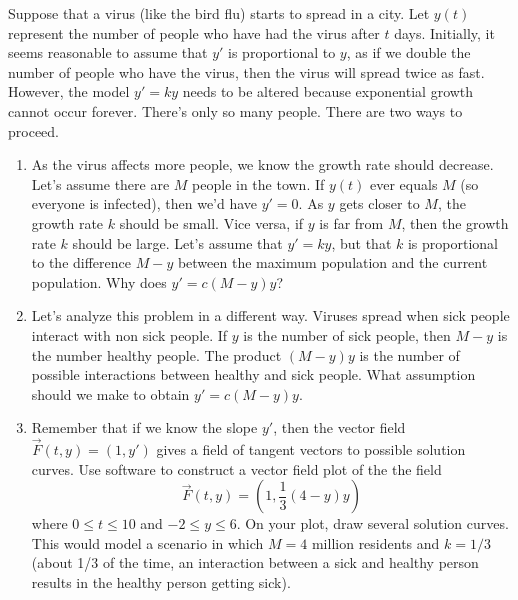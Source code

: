 \begin{problem}
 Suppose that a virus (like the bird flu) starts to spread in a city. Let $y(t)$ represent the number of people who have had the virus after $t$ days.  Initially, it seems reasonable to assume that $y'$ is proportional to $y$, as if we double the number of people who have the virus, then the virus will spread twice as fast. However, the model $y'=ky$ needs to be altered because exponential growth cannot occur forever.  There's only so many people. There are two ways to proceed.
\begin{enumerate}
\item 
{}%
As the virus affects more people, we know the growth rate should decrease. Let's assume there are $M$ people in the town. If $y(t)$ ever equals $M$ (so everyone is infected), then we'd have $y'=0$. As $y$ gets closer to $M$, the growth rate $k$ should be small. Vice versa, if $y$ is far from $M$, then the growth rate $k$ should be large. Let's assume that $y'=ky$, but that $k$ is proportional to the difference $M-y$ between the maximum population and the current population. Why does $y'=c(M-y)y$?
\item Let's analyze this problem in a different way. 
Viruses spread when sick people interact with non sick people.  If $y$ is the number of sick people, then $M-y$ is the number healthy people. The product $(M-y)y$ is the number of possible interactions between healthy and sick people. What assumption should we make to obtain $y'=c(M-y)y$.
\item
{}%
Remember that if we know the slope $y'$, then the vector field $\vec F(t,y) = (1,y')$ gives a field of tangent vectors to possible solution curves. Use software to construct a vector field plot of the the field $$\vec F(t,y) = (1,\frac{1}{3}(4-y)y)$$ where $0\leq t\leq 10$ and $-2\leq y\leq 6$. On your plot, draw several solution curves. This would model a scenario in which $M=4$ million residents and $k=1/3$ (about 1/3 of the time, an interaction between a sick and healthy person results in the healthy person getting sick). 
\end{enumerate}

\end{problem}


